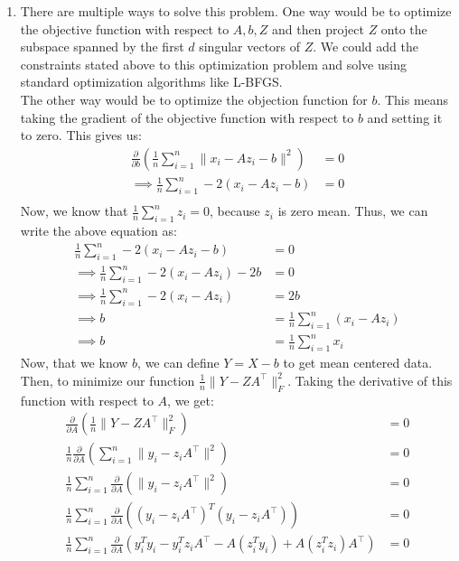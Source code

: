 \documentclass[a4paper]{article}
\newcounter{thm}
\theoremstyle{definition}
\begin{document}
\begin{enumerate}
    \item There are multiple ways to solve this problem. One way would be to optimize the objective function with respect to $A, b, Z$ and then project $Z$ onto the subspace spanned by the first $d$ singular vectors of $Z$. We could add the constraints stated above to this optimization problem and solve using standard optimization algorithms like L-BFGS.\\
    The other way would be to optimize the objection function for $b$. This means taking the gradient of the objective function with respect to $b$ and setting it to zero. This gives us:
    \begin{align*}
        \frac{\partial}{\partial b} \left( \frac{1}{n} \sum_{i=1}^n \|x_i - Az_i - b\|^2 \right) &= 0 \\
        \implies \frac{1}{n} \sum_{i=1}^n -2(x_i - Az_i - b) &= 0\\
    \end{align*}
    Now, we know that $\frac{1}{n} \sum_{i=1}^n z_i = 0$, because $z_i$ is zero mean. Thus, we can write the above equation as:
    \begin{align*}
        \frac{1}{n} \sum_{i=1}^n -2(x_i - Az_i - b) &= 0\\
        \implies \frac{1}{n} \sum_{i=1}^n -2(x_i - Az_i) - 2b &= 0\\
        \implies \frac{1}{n} \sum_{i=1}^n -2(x_i - Az_i) &= 2b\\
        \implies b &= \frac{1}{n} \sum_{i=1}^n (x_i - Az_i) \\
        \implies b &= \frac{1}{n} \sum_{i=1}^n x_i
    \end{align*}
    Now, that we know $b$, we can define $Y = X - b$ to get mean centered data. Then, to minimize our function $\frac{1}{n} \| Y - ZA^\top\|_F^2$. 
    Taking the derivative of this function with respect to $A$, we get:
    \begin{align*}
        \frac{\partial}{\partial A} \left( \frac{1}{n} \| Y - ZA^\top\|_F^2 \right) &= 0 \\
        \frac{1}{n} \frac{\partial}{\partial A} \left( \sum_{i=1}^n \| y_i - z_iA^\top\|^2 \right) &= 0 \\
        \frac{1}{n} \sum_{i=1}^n \frac{\partial}{\partial A} \left( \| y_i - z_iA^\top\|^2 \right) &= 0 \\
        \frac{1}{n} \sum_{i=1}^n \frac{\partial}{\partial A} \left( (y_i - z_iA^\top)^T(y_i - z_iA^\top) \right) &= 0 \\
        \frac{1}{n} \sum_{i=1}^n \frac{\partial}{\partial A} \left( y_i^Ty_i - y_i^Tz_iA^\top - A(z_i^Ty_i) + A(z_i^Tz_i)A^\top \right) &= 0 \\

\end{align*}
\end{enumerate}
\end{document}
